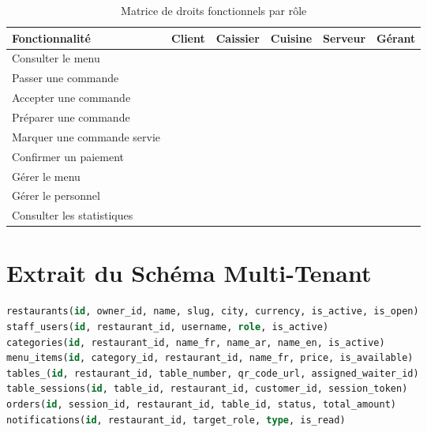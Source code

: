 \documentclass[12pt,a4paper]{report}
\newcommand{\checkmarkitem}{\ding{51}}
\newcommand{\crossitem}{\ding{55}}
\newcommand{\cmark}{\textcolor{accent}{\checkmarkitem}}
\newcommand{\xmark}{\textcolor{primary}{\crossitem}}
\begin{document}
\begin{table}[H]
    \centering
    \begin{tabularx}{\textwidth}{l c c c c c}
        \toprule
        \rowcolor{primary!10}
        \textbf{Fonctionnalité} & \textbf{Client} & \textbf{Caissier} & \textbf{Cuisine} & \textbf{Serveur} & \textbf{Gérant} \\
        \midrule
        Consulter le menu & \cmark & \cmark & \xmark & \cmark & \cmark \\
        Passer une commande & \cmark & \cmark & \xmark & \xmark & \cmark \\
        Accepter une commande & \xmark & \cmark & \xmark & \xmark & \cmark \\
        Préparer une commande & \xmark & \xmark & \cmark & \xmark & \cmark \\
        Marquer une commande servie & \xmark & \xmark & \xmark & \cmark & \cmark \\
        Confirmer un paiement & \xmark & \cmark & \xmark & \xmark & \cmark \\
        Gérer le menu & \xmark & \xmark & \xmark & \xmark & \cmark \\
        Gérer le personnel & \xmark & \xmark & \xmark & \xmark & \cmark \\
        Consulter les statistiques & \xmark & \xmark & \xmark & \xmark & \cmark \\
        \bottomrule
    \end{tabularx}
    \caption{Matrice de droits fonctionnels par rôle}
    \label{tab:roles-matrix}
\end{table}

\section{Extrait du Schéma Multi-Tenant}

\begin{lstlisting}[language=SQL, caption={Principe de rattachement des données à un restaurant}]
restaurants(id, owner_id, name, slug, city, currency, is_active, is_open)
staff_users(id, restaurant_id, username, role, is_active)
categories(id, restaurant_id, name_fr, name_ar, name_en, is_active)
menu_items(id, category_id, restaurant_id, name_fr, price, is_available)
tables_(id, restaurant_id, table_number, qr_code_url, assigned_waiter_id)
table_sessions(id, table_id, restaurant_id, customer_id, session_token)
orders(id, session_id, restaurant_id, table_id, status, total_amount)
notifications(id, restaurant_id, target_role, type, is_read)
\end{lstlisting}
\end{document}
